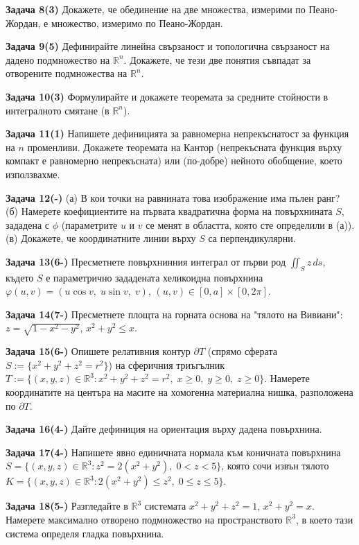 \documentclass[10pt]{article}
\begin{document}
\textbf{Задача 8(3) }Докажете, че обединение на две множества, измерими по Пеано-Жордан, е множество, измеримо по Пеано-Жордан. 

\textbf{Задача 9(5) }Дефинирайте линейна свързаност и топологична свързаност на дадено подмножество на $\mathbb{R}^n$. Докажете, че тези две понятия съвпадат за отворените подмножества на $\mathbb{R}^n$. 

\textbf{Задача 10(3) }Формулирайте и докажете теоремата за средните стойности в интегралното смятане (в $\mathbb{R}^n$).

\textbf{Задача 11(1) }Напишете дефиницията за равномерна непрекъснатост за функция на $n$ променливи. Докажете теоремата на Кантор (непрекъсната функция върху компакт е равномерно непрекъсната) или (по-добре) нейното обобщение, което използвахме. 

\textbf{Задача 12(-) }(а) В кои точки на равнината това изображение има пълен ранг? 
(б) Намерете коефициентите на първата квадратична форма на повърхнината $S$, зададена с $\phi$ (параметрите $u$ и $v$ се менят в областта, която сте определили в (а)).
(в) Докажете, че координатните линии върху $S$ са перпендикулярни.

\textbf{Задача 13(6-) }Пресметнете повърхнинния интеграл от първи род $\iint_S z \,ds$, където $S$ е параметрично зададената хеликоидна повърхнина $\varphi(u,v) = (u\cos v,\; u\sin v,\; v)$, $(u,v) \in [0,a]\times[0,2\pi]$.

\textbf{Задача 14(7-) }Пресметнете площта на горната основа на "тялото на Вивиани": $z = \sqrt{1-x^2-y^2}$, $x^2+y^2 \le x$. 

\textbf{Задача 15(6-) }Опишете релативния контур $\partial T$ (спрямо сферата $S := \{x^2+y^2+z^2 = r^2\}$) на сферичния триъгълник $T := \{(x,y,z)\in\mathbb{R}^3: x^2+y^2+z^2 = r^2,\; x\ge0,\; y\ge0,\; z\ge0\}$. Намерете координатите на центъра на масите на хомогенна материална нишка, разположена по $\partial T$. 

\textbf{Задача 16(4-) }Дайте дефиниция на ориентация върху дадена повърхнина. 

\textbf{Задача 17(4-) }Напишете явно единичната нормала към коничната повърхнина $S = \{(x,y,z)\in\mathbb{R}^3: z^2 = 2(x^2+y^2),\; 0<z<5\}$, която сочи извън тялото $K = \{(x,y,z)\in\mathbb{R}^3: 2(x^2+y^2) \le z^2,\; 0\le z\le 5\}$.

\textbf{Задача 18(5-) }Разгледайте в $\mathbb{R}^3$ системата $x^2+y^2+z^2 = 1$, $x^2+y^2 = x$. Намерете максимално отворено подмножество на пространството $\mathbb{R}^3$, в което тази система определя гладка повърхнина. 
\end{document}
